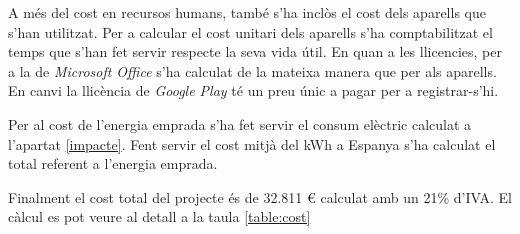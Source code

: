 A més del cost en recursos humans, també s'ha inclòs el cost dels aparells que s'han utilitzat. Per a calcular el cost unitari dels aparells s'ha comptabilitzat el temps que s'han fet servir respecte la seva vida útil. En quan a les llicencies, per a la de \textit{Microsoft Office} s'ha calculat de la mateixa manera que per als aparells. En canvi la llicència de \textit{Google Play} té un preu únic a pagar per a registrar-s'hi. 

Per al cost de l'energia emprada s'ha fet servir el consum elèctric calculat a l'apartat \ref{impacte}. Fent servir el cost mitjà del kWh a Espanya s'ha calculat el total referent a l'energia emprada.

Finalment el cost total del projecte és de 32.811 \euro { calculat} amb un 21\% d'IVA. El càlcul es pot veure al detall a la taula \ref{table:cost}


